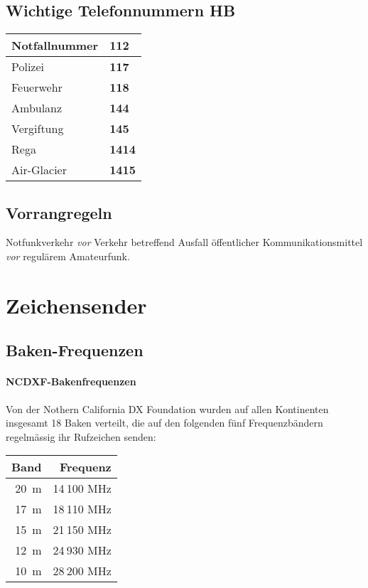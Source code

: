 \subsection{Wichtige Telefonnummern HB}
\begin{tabular}{l  >{\bfseries} l}
Notfallnummer & 112 \\ \midrule
Polizei & 117 \\ \midrule
Feuerwehr & 118 \\ \midrule
Ambulanz & 144 \\ \midrule
Vergiftung & 145 \\ \midrule
Rega & 1414 \\ \midrule
Air-Glacier & 1415 \\ \midrule
\end{tabular}

\subsection{Vorrangregeln}
Notfunkverkehr \textit{vor} Verkehr betreffend Ausfall öffentlicher Kommunikationsmittel \textit{vor} regulärem Amateurfunk.



\section{Zeichensender}
\subsection{Baken-Frequenzen}
\paragraph{NCDXF-Bakenfrequenzen} Von der Nothern California DX Foundation wurden auf allen Kontinenten insgesamt 18 Baken verteilt, die auf den folgenden fünf Frequenzbändern regelmässig ihr Rufzeichen senden:

\begin{tabular}{r r}
\bfseries Band & \bfseries Frequenz \\ \toprule
20 m & 14 100 MHz \\ \midrule                                                                                                                                                                 
17 m & 18 110 MHz \\ \midrule                                                                                                                                                                 
15 m & 21 150 MHz \\ \midrule                                                                                                                                                                 
12 m & 24 930 MHz \\ \midrule                                                                                                                                                                 
10 m & 28 200 MHz \\ \midrule
\end{tabular}

